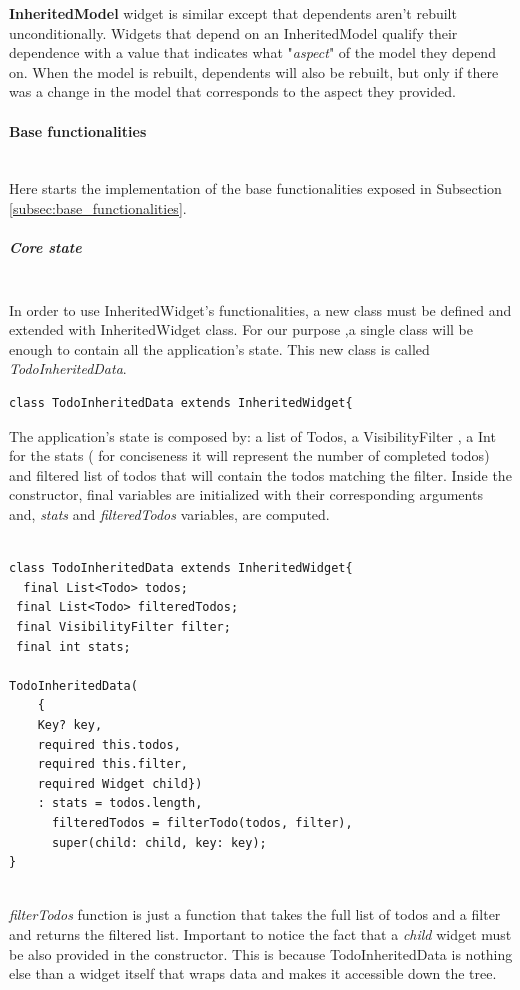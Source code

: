 \textbf{InheritedModel} widget is similar except that dependents aren't rebuilt unconditionally.
Widgets that depend on an InheritedModel qualify their dependence with a value that indicates what "\textit{aspect}" of the model they depend on. When the model is rebuilt, dependents will also be rebuilt, but only if there was a change in the model that corresponds to the aspect they provided.
\paragraph{Base functionalities} \mbox{} \\
\label{par:todo_app_inherited_widget_base_app}
Here starts the implementation of the base functionalities exposed in Subsection \ref{subsec:base_functionalities}.
\subparagraph{Core state}\mbox{}\\
\label{subpar:todo_app_inherited_widget_core_state}
In order to use InheritedWidget's functionalities, a new class must be defined and extended with InheritedWidget class. For our purpose ,a single class will be enough to contain all the application's state. This new class is called \textit{TodoInheritedData}.
\mbox{}\\
 \mbox{}

\begin{verbatim}
class TodoInheritedData extends InheritedWidget{
\end{verbatim}
\mbox{}

The application's state is composed by: a list of Todos, a VisibilityFilter , a Int for the stats ( for conciseness it will represent the number of completed todos) and filtered list of todos that will contain the todos matching the filter. Inside the constructor, final variables are initialized with their corresponding arguments and, \textit{stats} and \textit{filteredTodos} variables, are computed. 
\mbox{}\\
\mbox{}
\begin{verbatim}

class TodoInheritedData extends InheritedWidget{
  final List<Todo> todos;
 final List<Todo> filteredTodos;
 final VisibilityFilter filter;
 final int stats;
 
TodoInheritedData(
    { 
    Key? key,
    required this.todos,
    required this.filter,
    required Widget child})
    : stats = todos.length,
      filteredTodos = filterTodo(todos, filter),
      super(child: child, key: key);
}
\end{verbatim}
\mbox{}\\
\textit{filterTodos} function is just a function that takes the full list of todos and a filter and returns the filtered list. Important to notice  the fact that a \textit{child} widget must be also provided in the constructor. This is because TodoInheritedData is nothing else than a widget itself that wraps data and makes it accessible down the tree.


